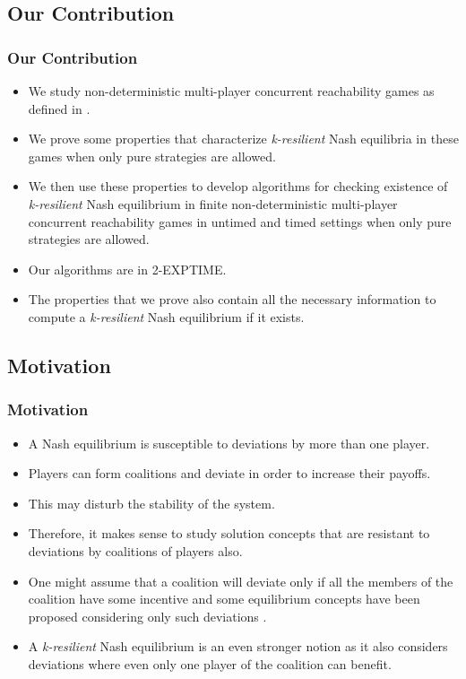 \documentclass{beamer}
\begin{document}
\subsection*{Our Contribution}
\begin{frame}
\frametitle{Our Contribution}
  \begin{itemize}
	\item We study non-deterministic multi-player concurrent reachability games as defined in \cite{BBM-concur10,BBM-report}.
 	\item We prove some properties that characterize \textit{k-resilient} Nash equilibria in these games when only pure strategies are allowed.
 	\item We then use these properties to develop algorithms for checking existence of \textit{k-resilient} Nash equilibrium in finite non-deterministic multi-player concurrent reachability games in untimed and timed settings when only pure strategies are allowed.
 	\item Our algorithms are in 2-EXPTIME.
 	\item The properties that we prove also contain all the necessary information to compute a \textit{k-resilient} Nash equilibrium if it exists.
  \end{itemize}
\end{frame}

\subsection*{Motivation}
\begin{frame}
\frametitle{Motivation}
  \begin{itemize}
	\item A Nash equilibrium is susceptible to deviations by more than one player.
	\item Players can form coalitions and deviate in order to increase their payoffs.
 	\item This may disturb the stability of the system.
 	\item Therefore, it makes sense to study solution concepts that are resistant to deviations by coalitions of players also. 
 	\item One might assume that a coalition will deviate only if all the members of the coalition have some incentive and some equilibrium concepts have been proposed considering only such deviations \cite{Aumann-59,Bernheim-1987,Moreno-1996}.
  	\item A \textit{k-resilient} Nash equilibrium is an even stronger notion as it also considers deviations where even only one player of the coalition can benefit.
  \end{itemize}
\end{frame}
\end{document}
